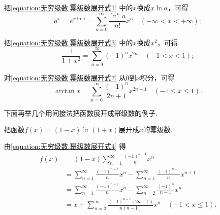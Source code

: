 把\cref{equation:无穷级数.幂级数展开式1} 中的\(x\)换成\(x \ln a\)，可得
\begin{equation}\label{equation:无穷级数.幂级数展开式6}
a^x = e^{x \ln a} = \sum\limits_{n=0}^\infty \frac{\ln^n a}{n!} x^n
\quad(-\infty<x<+\infty);
\end{equation}

把\cref{equation:无穷级数.幂级数展开式3} 中的\(x\)换成\(x^2\)，可得
\begin{equation}\label{equation:无穷级数.幂级数展开式7}
\frac{1}{1+x^2} = \sum\limits_{n=0}^\infty (-1)^n x^{2n}
\quad(-1<x<1);
\end{equation}

对\cref{equation:无穷级数.幂级数展开式7} 从\(0\)到\(x\)积分，可得
\begin{equation}
\arctan x = \sum\limits_{n=0}^\infty \frac{(-1)^n}{2n+1} x^{2n+1}
\quad(-1 \leq x \leq 1).
\end{equation}

下面再举几个用间接法把函数展开成幂级数的例子.

\begin{example}
把函数\(f(x) = (1-x) \ln(1+x)\)展开成\(x\)的幂级数.
\begin{solution}
由\cref{equation:无穷级数.幂级数展开式4} 得\[
\begin{split}
f(x) &= (1-x) \sum\limits_{n=1}^\infty \frac{(-1)^{n-1}}{n} x^n \\
&= \sum\limits_{n=1}^\infty \frac{(-1)^{n-1}}{n} x^n
	- \sum\limits_{n=1}^\infty \frac{(-1)^{n-1}}{n} x^{n+1} \\
&= \sum\limits_{n=1}^\infty \frac{(-1)^{n-1}}{n} x^n
	- \sum\limits_{n=2}^\infty \frac{(-1)^n}{n-1} x^n \\
&= x + \sum\limits_{n=2}^\infty \frac{(-1)^{n-1} (2n-1)}{n(n-1)} x^n
\quad(-1 < x \leq 1).
\end{split}
\]
\end{solution}
\end{example}

